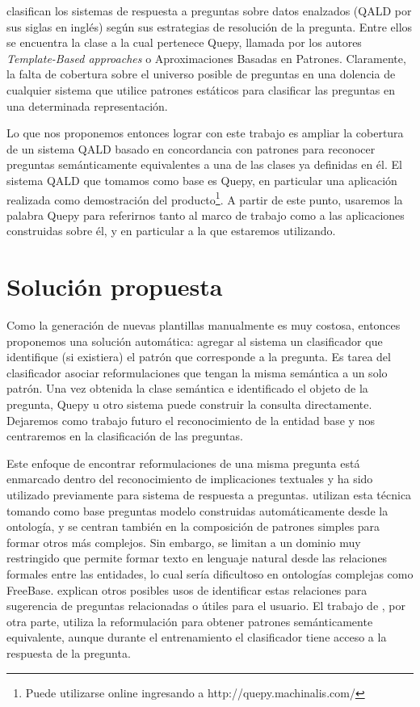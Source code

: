\citet{ungerQALD} clasifican los sistemas de respuesta a preguntas sobre datos enalzados (QALD por sus siglas en inglés) según sus estrategias de resolución de la pregunta. Entre ellos se encuentra la clase a la cual pertenece Quepy, llamada por los autores \textit{Template-Based approaches} o Aproximaciones Basadas en Patrones. Claramente, la falta de cobertura sobre el universo posible de preguntas en una dolencia de cualquier sistema que utilice patrones estáticos para clasificar las preguntas en una determinada representación.

Lo que nos proponemos entonces lograr con este trabajo es ampliar la cobertura de un sistema QALD basado en concordancia con patrones para reconocer preguntas semánticamente equivalentes a una de las clases ya definidas en él. El sistema QALD que tomamos como base es Quepy, en particular una aplicación realizada como demostración del producto\footnote{Puede utilizarse online ingresando a http://quepy.machinalis.com/}. A partir de este punto, usaremos la palabra Quepy para referirnos tanto al marco de trabajo como a las aplicaciones construidas sobre él, y en particular a la que estaremos utilizando.

\section{Solución propuesta}

Como la generación de nuevas plantillas manualmente es muy costosa, entonces proponemos una solución automática: agregar al sistema un clasificador que identifique (si existiera) el patrón que corresponde a la pregunta. Es tarea del clasificador asociar reformulaciones que tengan la misma semántica a un solo patrón. Una vez obtenida la clase semántica e identificado el objeto de la pregunta, Quepy u otro sistema puede construir la consulta directamente. Dejaremos como trabajo futuro el reconocimiento de la entidad base y nos centraremos en la clasificación de las preguntas.

Este enfoque de encontrar reformulaciones de una misma pregunta está enmarcado dentro del reconocimiento de implicaciones textuales y ha sido utilizado previamente para sistema de respuesta a preguntas. \citet{ou_entailement} utilizan esta técnica tomando como base preguntas modelo construidas automáticamente desde la ontología, y se centran también en la composición de patrones simples para formar otros más complejos. Sin embargo, se limitan a un dominio muy restringido que permite formar texto en lenguaje natural desde las relaciones formales entre las entidades, lo cual sería dificultoso en ontologías complejas como FreeBase. \citet{rui_relations} explican otros posibles usos de identificar estas relaciones para sugerencia de preguntas relacionadas o útiles para el usuario. El trabajo de \citet{Kosseimmuyparecido}, por otra parte, utiliza la reformulación para obtener patrones semánticamente equivalente, aunque durante el entrenamiento el clasificador tiene acceso a la respuesta de la pregunta.

